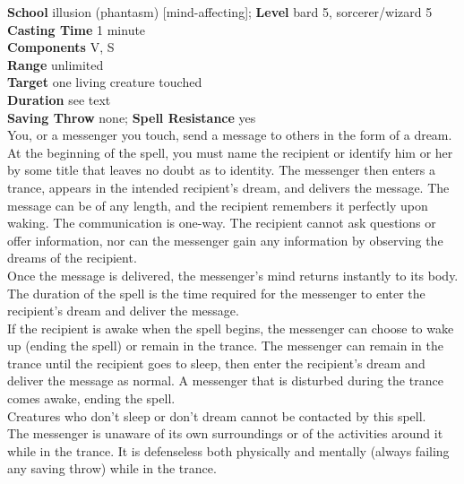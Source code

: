\textbf{School} illusion (phantasm) [mind-affecting]; \textbf{Level} bard 5, sorcerer/wizard 5\\
\textbf{Casting Time} 1 minute\\
\textbf{Components} V, S\\
\textbf{Range} unlimited\\
\textbf{Target} one living creature touched\\
\textbf{Duration} see text\\
\textbf{Saving Throw} none; \textbf{Spell Resistance} yes\\
You, or a messenger you touch, send a message to others in the form of a dream. At the beginning of the spell, you must name the recipient or identify him or her by some title that leaves no doubt as to identity. The messenger then enters a trance, appears in the intended recipient's dream, and delivers the message. The message can be of any length, and the recipient remembers it perfectly upon waking. The communication is one-way. The recipient cannot ask questions or offer information, nor can the messenger gain any information by observing the dreams of the recipient.\\
Once the message is delivered, the messenger's mind returns instantly to its body. The duration of the spell is the time required for the messenger to enter the recipient's dream and deliver the message.\\
If the recipient is awake when the spell begins, the messenger can choose to wake up (ending the spell) or remain in the trance. The messenger can remain in the trance until the recipient goes to sleep, then enter the recipient's dream and deliver the message as normal. A messenger that is disturbed during the trance comes awake, ending the spell.\\
Creatures who don't sleep or don't dream cannot be contacted by this spell.\\
The messenger is unaware of its own surroundings or of the activities around it while in the trance. It is defenseless both physically and mentally (always failing any saving throw) while in the trance.\\
